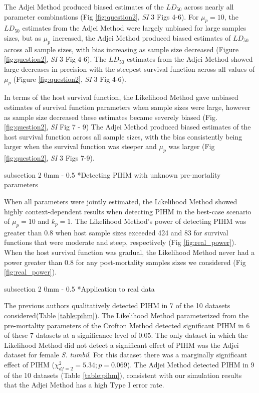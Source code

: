 \documentclass[12pt, a4paper]{article}
\makeatletter
\renewcommand{\subsection}{\@startsection
{subsection}%
{2}%
{0mm}%
{-\baselineskip}%
{0.5\baselineskip}%
{\normalfont\bf}} %
\makeatother
\begin{document}
The Adjei Method produced biased estimates of the $LD_{50}$ across nearly all parameter combinations (Fig \ref{fig:question2}, \emph{SI} 3 Figs 4-6).  For $\mu_p = 10$, the $LD_{50}$
estimates from the Adjei Method were largely unbiased for large samples sizes, but as $\mu_p$ increased, the Adjei Method
produced biased estimates of $LD_{50}$ across all sample sizes, with bias
increasing as sample size decreased (Figure \ref{fig:question2}, \emph{SI} 3 Fig 4-6). The $LD_{50}$ estimates from the Adjei
Method showed large decreases in precision with the steepest survival function across all values of $\mu_p$ (Figure \ref{fig:question2}, \emph{SI} 3 Fig 4-6).

In terms of the host survival function, the Likelihood Method gave unbiased estimates of survival function parameters when sample sizes were large, however as sample size decreased these estimates became severely biased (Fig. \ref{fig:question2}, \emph{SI} Fig 7 - 9) The Adjei Method produced
biased estimates of the host survival function across all sample sizes, with the bias
consistently being larger when the survival function was steeper and $\mu_p$ was larger (Fig \ref{fig:question2}, \emph{SI} 3 Figs 7-9).

\subsection*{Detecting PIHM with unknown pre-mortality parameters}

When all parameters were jointly estimated, the Likelihood Method showed highly
context-dependent results when detecting PIHM in the best-case scenario of
$\mu_p = 10$ and $k_p = 1$. The Likelihood Method's power of detecting PIHM was
greater than 0.8 when host sample sizes exceeded 424 and 83  for survival
functions that were moderate and steep, respectively (Fig
\ref{fig:real_power}).  When the host survival function was gradual, the
Likelihood Method never had a power greater than 0.8 for any post-mortality
samples sizes we considered (Fig \ref{fig:real_power}).

\subsection*{Application to real data}

The previous authors qualitatively detected PIHM
in 7 of the 10 datasets considered(Table \ref{table:pihm}).  The Likelihood Method parameterized
from the pre-mortality parameters of the Crofton Method detected significant
PIHM in 6 of these 7 datasets at a significance level of 0.05.  The only
dataset in which the Likelihood Method did not detect a significant effect of PIHM was the Adjei dataset
for female \emph{S. tumbil}.  For this dataset there was a marginally significant effect
of PIHM ($\chi^2_{df=2} = 5.34; p = 0.069$). The Adjei Method detected PIHM in 9 of the 10 datasets (Table \ref{table:pihm}), consistent with our simulation results that the Adjei Method has a high Type I error rate.
\end{document}
